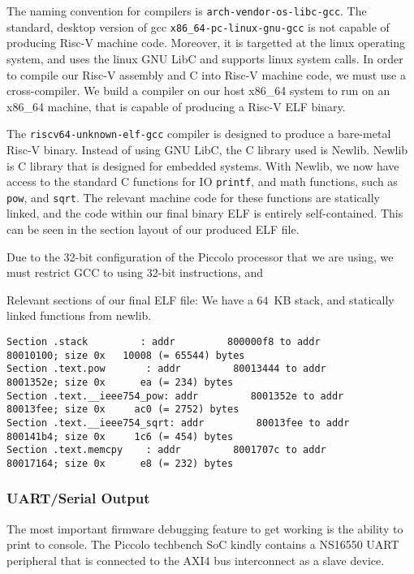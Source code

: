 \documentclass[a4paper,8pt]{report}
\begin{document}
The naming convention for compilers is \texttt{arch-vendor-os-libc-gcc}. The
standard, desktop version of gcc \texttt{x86\_64-pc-linux-gnu-gcc} is not
capable of producing Risc-V machine code. Moreover, it is targetted at the linux
operating system, and uses the linux GNU LibC and supports linux system calls.
In order to compile our Risc-V assembly and C into Risc-V machine code, we must
use a cross-compiler. We build a compiler on our host x86\_64 system to run on
an x86\_64 machine, that is capable of producing a Risc-V ELF binary.

The \texttt{riscv64-unknown-elf-gcc} compiler is designed to produce a
bare-metal Risc-V binary. Instead of using GNU LibC, the C library used is
Newlib. Newlib is C library that is designed for embedded systems. With Newlib,
we now have access to the standard C functions for IO \texttt{printf}, and math
functions, such as \texttt{pow}, and \texttt{sqrt}. The relevant machine code
for these functions are statically linked, and the code within our final binary
ELF is entirely self-contained. This can be seen in the section layout of our
produced ELF file.

Due to the 32-bit configuration of the Piccolo processor that we are using, we
must restrict GCC to using 32-bit instructions, and 

Relevant sections of our final ELF file: We have a $64$~KB stack, and statically
linked functions from newlib.  
\tiny
\begin{verbatim}
Section .stack         : addr         800000f8 to addr         80010100; size 0x   10008 (= 65544) bytes
Section .text.pow       : addr         80013444 to addr         8001352e; size 0x      ea (= 234) bytes
Section .text.__ieee754_pow: addr         8001352e to addr         80013fee; size 0x     ac0 (= 2752) bytes
Section .text.__ieee754_sqrt: addr         80013fee to addr         800141b4; size 0x     1c6 (= 454) bytes
Section .text.memcpy    : addr         8001707c to addr         80017164; size 0x      e8 (= 232) bytes
\end{verbatim}
\normalsize

\subsubsection{UART/Serial Output}
The most important firmware debugging feature to get working is the ability to
print to console. The Piccolo techbench SoC kindly contains a NS16550 UART
peripheral that is connected to the AXI4 bus interconnect as a slave device.  
\end{document}
